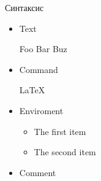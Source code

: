 \begin{frame}[fragile]{Синтаксис}
  \begin{itemize}
    \pause
    \item Text
      \begin{latexcode}
        Foo Bar Buz
      \end{latexcode}
    \pause  
    \item Command
      \begin{latexcode}
        \LaTeX
      \end{latexcode}
    \pause  
    \item Enviroment
      \begin{latexcode}
        \begin{itemize}
          \item The first item
          \item The second item
        \end{itemize}
      \end{latexcode}
    \pause  
    \item Comment
      \begin{latexcode}
      \end{latexcode}
  \end{itemize}
\end{frame}
